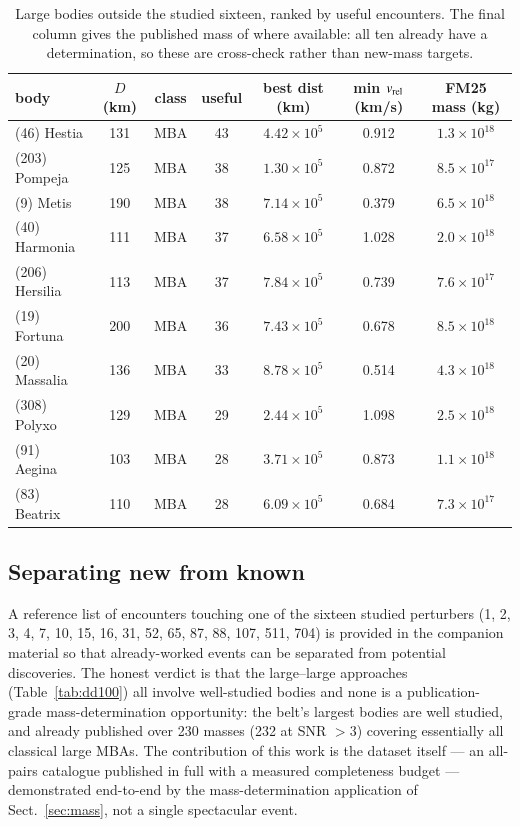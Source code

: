 \documentclass{aa}
\begin{document}
\begin{table}
\caption{Large bodies outside the studied sixteen, ranked by useful encounters.
The final column gives the published mass of \citet{fuentesmunoz2025} where
available: all ten already have a determination, so these are cross-check rather
than new-mass targets.}
\label{tab:candperturbers}
\centering
\small
\begin{tabular}{lcccccc}
\hline\hline
body & $D$ (km) & class & useful & best dist (km) & min $v_{\rm rel}$ (km/s) & FM25 mass (kg) \\
\hline
(46) Hestia     & 131 & MBA & 43 & $4.42\times10^5$ & 0.912 & $1.3\times10^{18}$ \\
(203) Pompeja   & 125 & MBA & 38 & $1.30\times10^5$ & 0.872 & $8.5\times10^{17}$ \\
(9) Metis       & 190 & MBA & 38 & $7.14\times10^5$ & 0.379 & $6.5\times10^{18}$ \\
(40) Harmonia   & 111 & MBA & 37 & $6.58\times10^5$ & 1.028 & $2.0\times10^{18}$ \\
(206) Hersilia  & 113 & MBA & 37 & $7.84\times10^5$ & 0.739 & $7.6\times10^{17}$ \\
(19) Fortuna    & 200 & MBA & 36 & $7.43\times10^5$ & 0.678 & $8.5\times10^{18}$ \\
(20) Massalia   & 136 & MBA & 33 & $8.78\times10^5$ & 0.514 & $4.3\times10^{18}$ \\
(308) Polyxo    & 129 & MBA & 29 & $2.44\times10^5$ & 1.098 & $2.5\times10^{18}$ \\
(91) Aegina     & 103 & MBA & 28 & $3.71\times10^5$ & 0.873 & $1.1\times10^{18}$ \\
(83) Beatrix    & 110 & MBA & 28 & $6.09\times10^5$ & 0.684 & $7.3\times10^{17}$ \\
\hline
\end{tabular}
\end{table}

\subsection{Separating new from known}
\label{sec:newknown}

A reference list of encounters touching one of the sixteen studied perturbers
(1, 2, 3, 4, 7, 10, 15, 16, 31, 52, 65, 87, 88, 107, 511, 704) is provided in
the companion material so that already-worked events can be separated from
potential discoveries. The honest verdict is that the large--large approaches
(Table~\ref{tab:dd100}) all involve well-studied bodies and none is a
publication-grade mass-determination opportunity: the belt's largest bodies are
well studied, and \citet{fuentesmunoz2025} already published over 230 masses
(232 at SNR $>3$) covering essentially all classical large MBAs. The contribution of this work is the dataset itself --- an
all-pairs catalogue published in full with a measured completeness budget ---
demonstrated end-to-end by the mass-determination application of
Sect.~\ref{sec:mass}, not a single spectacular event.
\end{document}
